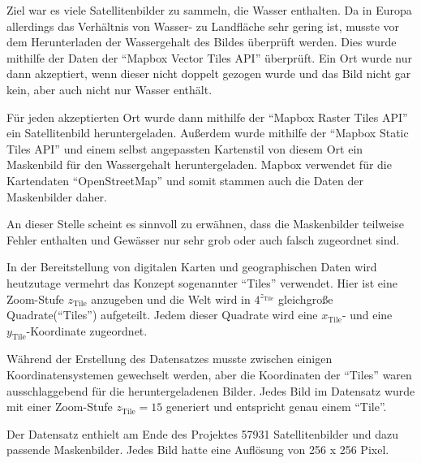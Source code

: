 Ziel war es viele Satellitenbilder zu sammeln, die Wasser enthalten.
Da in Europa allerdings das Verhältnis von Wasser- zu Landfläche sehr gering ist, musste vor dem Herunterladen der Wassergehalt des Bildes überprüft werden.
Dies wurde mithilfe der Daten der \enquote{Mapbox Vector Tiles API} überprüft. \cite{mapbox_vector_tiles}
Ein Ort wurde nur dann akzeptiert, wenn dieser nicht doppelt gezogen wurde und das Bild nicht gar kein, aber auch nicht nur Wasser enthält.

Für jeden akzeptierten Ort wurde dann mithilfe der \enquote{Mapbox Raster Tiles API} ein Satellitenbild heruntergeladen.\cite{mapbox_raster_tiles}
Außerdem wurde mithilfe der \enquote{Mapbox Static Tiles API} und einem selbst angepassten Kartenstil von diesem Ort ein Maskenbild für den Wassergehalt heruntergeladen.\cite{mapbox_static_tiles}
Mapbox verwendet für die Kartendaten \enquote{OpenStreetMap} und somit stammen auch die Daten der Maskenbilder daher.\cite{OpenStreetMap}

An dieser Stelle scheint es sinnvoll zu erwähnen, dass die Maskenbilder teilweise Fehler enthalten und Gewässer nur sehr grob oder auch falsch zugeordnet sind. 

In der Bereitstellung von digitalen Karten und geographischen Daten wird heutzutage vermehrt das Konzept sogenannter \enquote{Tiles} verwendet.\cite{tiles}
Hier ist eine Zoom-Stufe $z_\text{Tile}$ anzugeben und die Welt wird in $4^{z_\text{Tile}}$ gleichgroße Quadrate(\enquote{Tiles}) aufgeteilt.
Jedem dieser Quadrate wird eine $x_\text{Tile}$- und eine $y_\text{Tile}$-Koordinate zugeordnet.

Während der Erstellung des Datensatzes musste zwischen einigen Koordinatensystemen gewechselt werden, aber die Koordinaten der \enquote{Tiles} waren ausschlaggebend für die heruntergeladenen Bilder.
Jedes Bild im Datensatz wurde mit einer Zoom-Stufe $z_\text{Tile} = 15$ generiert und entspricht genau einem \enquote{Tile}.

Der Datensatz enthielt am Ende des Projektes 57931 Satellitenbilder und dazu passende Maskenbilder.
Jedes Bild hatte eine Auflösung von 256 x 256 Pixel.
